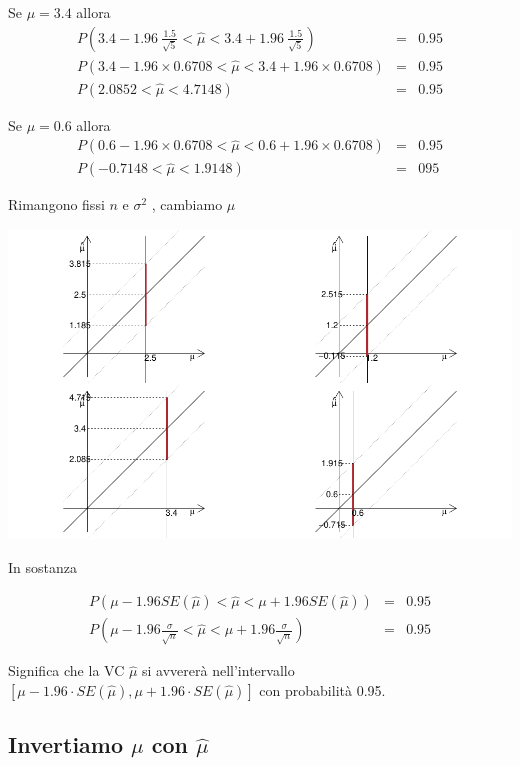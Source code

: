 \documentclass[
  11pt,
]{book}
\theoremstyle{mytheoremstyle}
\theoremstyle{mydefstyle}
\begin{document}
Se \(\mu= 3.4\) allora
\begin{eqnarray*}
  P\left(3.4-1.96~\frac{1.5}{\sqrt{5}}<\hat \mu < 3.4+1.96~\frac{1.5}{\sqrt{5}}\right) &=& 0.95 \\
  P\left(3.4-1.96\times0.6708<\hat \mu < 3.4+1.96\times0.6708\right) &=& 0.95 \\
  P(2.0852 < \hat \mu < 4.7148) &=& 0.95 
\end{eqnarray*}

Se \(\mu= 0.6\) allora
\begin{eqnarray*}
  P\left(0.6-1.96\times0.6708<\hat \mu < 0.6+1.96\times0.6708\right) &=& 0.95 \\
  P(-0.7148 < \hat \mu < 1.9148) &=& 095 
\end{eqnarray*}

Rimangono fissi \(n\) e \(\sigma^2\) , cambiamo \(\mu\)

\begin{center}\includegraphics{Appunti_di_Statistica_2025_files/figure-latex/13-stima-intervallare-9-1} \end{center}

In sostanza

\begin{eqnarray*}
  P(\mu - 1.96 SE(\hat\mu)<\hat\mu<\mu + 1.96 SE(\hat\mu)) &=& 0.95\\
  P\left(\mu - 1.96 \frac\sigma {\sqrt n}<\hat\mu<\mu + 1.96 \frac\sigma {\sqrt n}\right) &=& 0.95
\end{eqnarray*}

Significa che la VC \(\hat\mu\) si avvererà nell'intervallo \([\mu-1.96\cdot SE(\hat\mu),\mu+1.96\cdot SE(\hat\mu)]\) con probabilità 0.95.

\subsection{\texorpdfstring{Invertiamo \(\mu\) con \(\hat\mu\)}{Invertiamo \textbackslash mu con \textbackslash hat\textbackslash mu}}\label{invertiamo-mu-con-hatmu}
\end{document}
